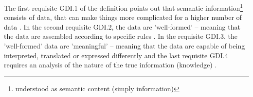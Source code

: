      
	
			The first requisite GDI.1 of the definition points out that semantic information\footnote{understood as semantic content (simply information)} consists of data, that can make things more complicated for a higher number of data \cite{Floridi2013}. In the second requisite GDI.2, the data are 'well-formed' -- meaning that the data are assembled according to specific rules \cite{Floridi2013}. In the requisite GDI.3, the 'well-formed' data are 'meaningful' -- meaning that the data are capable of being interpreted, translated or expressed differently and the last requisite GDI.4 requires an analysis of the nature of the true information (knowledge) \cite{Floridi2013}.	
			
				
		
